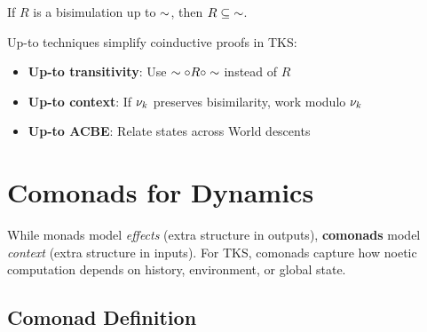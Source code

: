 \begin{theorem}[Soundness of Up-To]
\label{thm:up-to-soundness}
If $R$ is a bisimulation up to $\sim$, then $R \subseteq {\sim}$.
\end{theorem}

\begin{remark}
\label{rem:up-to-tks}
Up-to techniques simplify coinductive proofs in TKS:
\begin{itemize}
  \item \textbf{Up-to transitivity}: Use $\sim \circ R \circ \sim$ instead of $R$
  \item \textbf{Up-to context}: If $\nu_{k}$ preserves bisimilarity, work modulo $\nu_{k}$
  \item \textbf{Up-to ACBE}: Relate states across World descents
\end{itemize}
\end{remark}

\section{Comonads for Dynamics}
\label{sec:comonads-dynamics}

While monads model \emph{effects} (extra structure in outputs), \textbf{comonads}
model \emph{context} (extra structure in inputs). For TKS, comonads capture how
noetic computation depends on history, environment, or global state.

\subsection{Comonad Definition}
\label{subsec:comonad-def}

